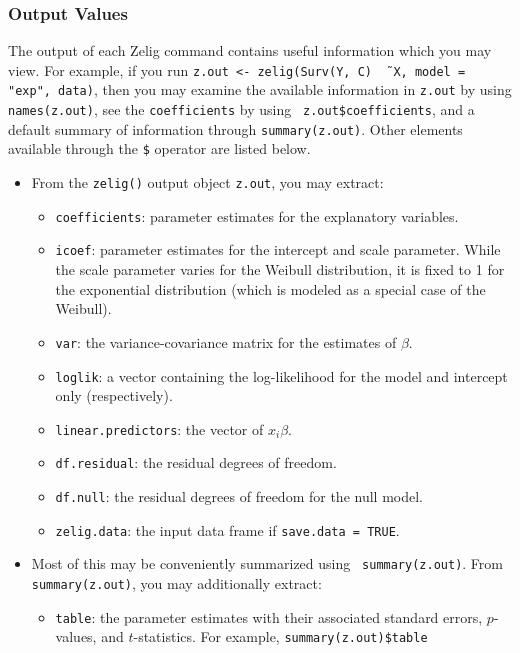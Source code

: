 \subsubsection{Output Values}

The output of each Zelig command contains useful information which you
may view.  For example, if you run \texttt{z.out <- zelig(Surv(Y,
  C) \~\, X, model = "exp", data)}, then you may examine the
available information in \texttt{z.out} by using
\texttt{names(z.out)}, see the {\tt coefficients} by using {\tt
  z.out\$coefficients}, and a default summary of information
through \texttt{summary(z.out)}.  Other elements available through
the {\tt \$} operator are listed below.

\begin{itemize}
\item From the {\tt zelig()} output object {\tt z.out}, you may extract:
   \begin{itemize}
   \item {\tt coefficients}: parameter estimates for the explanatory
     variables.
   \item {\tt icoef}: parameter estimates for the intercept and scale
     parameter.  While the scale parameter varies for the Weibull
     distribution, it is fixed to 1 for the exponential distribution
     (which is modeled as a special case of the Weibull).  
   \item {\tt var}: the variance-covariance matrix for the estimates
     of $\beta$.  
   \item {\tt loglik}: a vector containing the log-likelihood for the
     model and intercept only (respectively).
   \item {\tt linear.predictors}: the vector of
     $x_{i}\beta$.
   \item {\tt df.residual}: the residual degrees of freedom.
   \item {\tt df.null}: the residual degrees of freedom for the null
     model. 
   \item {\tt zelig.data}: the input data frame if {\tt save.data = TRUE}.  
   \end{itemize}

\item Most of this may be conveniently summarized using {\tt
   summary(z.out)}.  From {\tt summary(z.out)}, you may
 additionally extract: 
   \begin{itemize}
   \item {\tt table}: the parameter estimates with their
     associated standard errors, $p$-values, and $t$-statistics.  For
     example, {\tt summary(z.out)\$table}
   \end{itemize}


\end{itemize}
